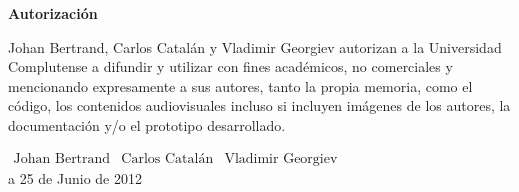 \hbox{}\newpage
{\huge \textbf{Autorización}}

\vspace{0.5in}Johan Bertrand, Carlos Catalán y Vladimir Georgiev autorizan a la Universidad Complutense a difundir y utilizar con fines académicos, no comerciales y mencionando expresamente a sus autores, tanto la propia memoria, como el código, los contenidos audiovisuales incluso si incluyen imágenes de los autores, la documentación y/o el prototipo desarrollado.\\
\begin{center}
	\vspace{2in}

	\large

	
	$\begin{array}{ccc}
		\text{Johan Bertrand} & \text{Carlos Catalán} & \text{Vladimir Georgiev}
	\end{array}$\\
	\vspace{0.4in} a 25 de Junio de 2012
\end{center}

\normalsize


